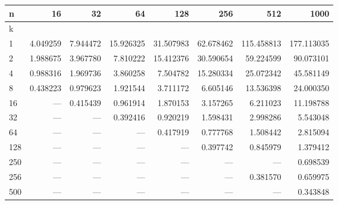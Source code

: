 \begin{tabular}{lrrrrrrr}
\toprule
{n} &      16   &      32   &       64   &       128  &       256  &        512  &        1000 \\
\midrule
k   &           &           &            &            &            &             &             \\
1   &  4.049259 &  7.944472 &  15.926325 &  31.507983 &  62.678462 &  115.458813 &  177.113035 \\
2   &  1.988675 &  3.967780 &   7.810222 &  15.412376 &  30.590654 &   59.224599 &   90.073101 \\
4   &  0.988316 &  1.969736 &   3.860258 &   7.504782 &  15.280334 &   25.072342 &   45.581149 \\
8   &  0.438223 &  0.979623 &   1.921544 &   3.711172 &   6.605146 &   13.536398 &   24.000350 \\
16  &       --- &  0.415439 &   0.961914 &   1.870153 &   3.157265 &    6.211023 &   11.198788 \\
32  &       --- &       --- &   0.392416 &   0.920219 &   1.598431 &    2.998286 &    5.543048 \\
64  &       --- &       --- &        --- &   0.417919 &   0.777768 &    1.508442 &    2.815094 \\
128 &       --- &       --- &        --- &        --- &   0.397742 &    0.845979 &    1.379412 \\
250 &       --- &       --- &        --- &        --- &        --- &         --- &    0.698539 \\
256 &       --- &       --- &        --- &        --- &        --- &    0.381570 &    0.659975 \\
500 &       --- &       --- &        --- &        --- &        --- &         --- &    0.343848 \\
\bottomrule
\end{tabular}

